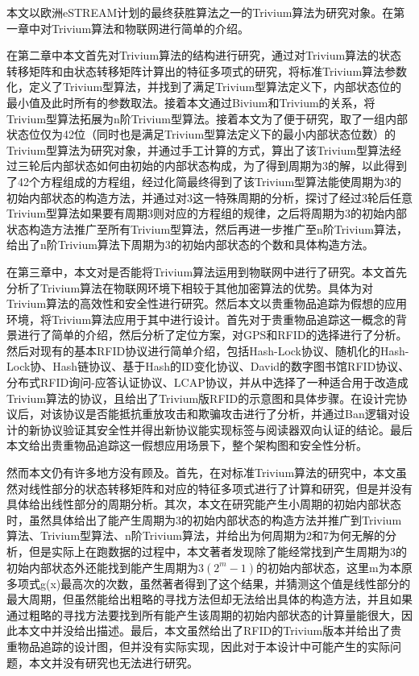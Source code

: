 
\begin{summary}
本文以欧洲eSTREAM计划的最终获胜算法之一的Trivium算法为研究对象。在第一章中对Trivium算法和物联网进行简单的介绍。

在第二章中本文首先对Trivium算法的结构进行研究，通过对Trivium算法的状态转移矩阵和由状态转移矩阵计算出的特征多项式的研究，将标准Trivium算法参数化，定义了Trivium型算法，并找到了满足Trivium型算法定义下，内部状态位的最小值及此时所有的参数取法。接着本文通过Bivium和Trivium的关系，将Trivium型算法拓展为n阶Trivium型算法。接着本文为了便于研究，取了一组内部状态位仅为42位（同时也是满足Trivium型算法定义下的最小内部状态位数）的Trivium型算法为研究对象，并通过手工计算的方式，算出了该Trivium型算法经过三轮后内部状态如何由初始的内部状态构成，为了得到周期为3的解，以此得到了42个方程组成的方程组，经过化简最终得到了该Trivium型算法能使周期为3的初始内部状态的构造方法，并通过对3这一特殊周期的分析，探讨了经过3轮后任意Trivium型算法如果要有周期3则对应的方程组的规律，之后将周期为3的初始内部状态构造方法推广至所有Trivium型算法，然后再进一步推广至n阶Trivium算法，给出了n阶Trivium算法下周期为3的初始内部状态的个数和具体构造方法。

在第三章中，本文对是否能将Trivium算法运用到物联网中进行了研究。本文首先分析了Trivium算法在物联网环境下相较于其他加密算法的优势。具体为对Trivium算法的高效性和安全性进行研究。然后本文以贵重物品追踪为假想的应用环境，将Trivium算法应用于其中进行设计。首先对于贵重物品追踪这一概念的背景进行了简单的介绍，然后分析了定位方案，对GPS和RFID的选择进行了分析。然后对现有的基本RFID协议进行简单介绍，包括Hash-Lock协议、随机化的Hash-Lock协、Hash链协议、基于Hash的ID变化协议、David的数字图书馆RFID协议、分布式RFID询问-应答认证协议、LCAP协议，并从中选择了一种适合用于改造成Trivium算法的协议，且给出了Trivium版RFID的示意图和具体步骤。在设计完协议后，对该协议是否能抵抗重放攻击和欺骗攻击进行了分析，并通过Ban逻辑对设计的新协议验证其安全性并得出新协议能实现标签与阅读器双向认证的结论。最后本文给出贵重物品追踪这一假想应用场景下，整个架构图和安全性分析。

然而本文仍有许多地方没有顾及。首先，在对标准Trivium算法的研究中，本文虽然对线性部分的状态转移矩阵和对应的特征多项式进行了计算和研究，但是并没有具体给出线性部分的周期分析。其次，本文在研究能产生小周期的初始内部状态时，虽然具体给出了能产生周期为3的初始内部状态的构造方法并推广到Trivium算法、Trivium型算法、n阶Trivium算法，并给出为何周期为2和7为何无解的分析，但是实际上在跑数据的过程中，本文著者发现除了能经常找到产生周期为3的初始内部状态外还能找到能产生周期为$3(2^{m}-1)$的初始内部状态，这里m为本原多项式g(x)最高次的次数，虽然著者得到了这个结果，并猜测这个值是线性部分的最大周期，但虽然能给出粗略的寻找方法但却无法给出具体的构造方法，并且如果通过粗略的寻找方法要找到所有能产生该周期的初始内部状态的计算量能很大，因此本文中并没给出描述。最后，本文虽然给出了RFID的Trivium版本并给出了贵重物品追踪的设计图，但并没有实际实现，因此对于本设计中可能产生的实际问题，本文并没有研究也无法进行研究。


\end{summary}
